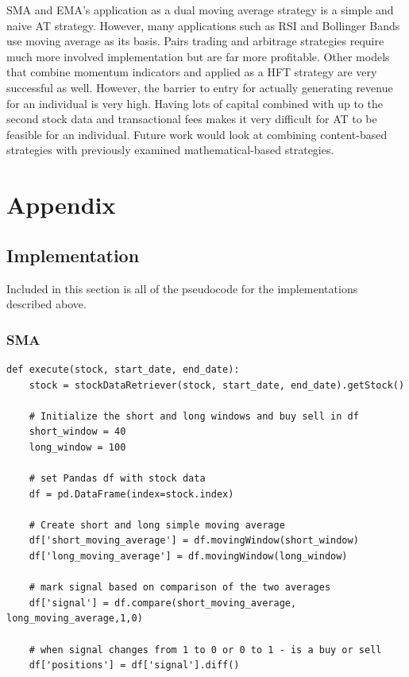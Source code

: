 \documentclass[letterpaper,11pt]{article}
\begin{document}
SMA and EMA's application as a dual moving average strategy is a simple and naive AT strategy. However, many applications such as RSI and Bollinger Bands use moving average as its basis. Pairs trading and arbitrage strategies require much more involved implementation but are far more profitable. Other models that combine momentum indicators and applied as a HFT strategy are very successful as well. However, the barrier to entry for actually generating revenue for an individual is very high. Having lots of capital combined with up to the second stock data and transactional fees makes it very difficult for AT to be feasible for an individual. Future work would look at combining content-based strategies with previously examined mathematical-based strategies.

\section{Appendix}

\subsection{Implementation}

Included in this section is all of the pseudocode for the implementations described above.

\subsubsection{SMA}

\begin{verbatim}
def execute(stock, start_date, end_date):
    stock = stockDataRetriever(stock, start_date, end_date).getStock()

    # Initialize the short and long windows and buy sell in df
    short_window = 40
    long_window = 100
    
    # set Pandas df with stock data
    df = pd.DataFrame(index=stock.index)

    # Create short and long simple moving average 
    df['short_moving_average'] = df.movingWindow(short_window)
    df['long_moving_average'] = df.movingWindow(long_window)
    
    # mark signal based on comparison of the two averages
    df['signal'] = df.compare(short_moving_average, long_moving_average,1,0)
    
    # when signal changes from 1 to 0 or 0 to 1 - is a buy or sell
    df['positions'] = df['signal'].diff()

\end{verbatim}
\end{document}

